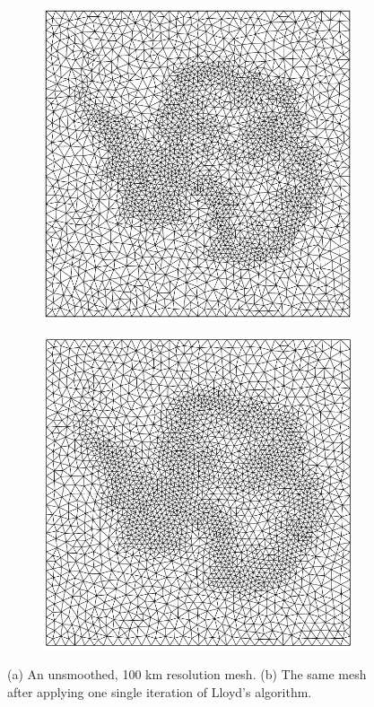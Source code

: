 \documentclass{article}
\begin{document}
\begin{figure}[H] \label{fig:mesh_Lloyds_algorithm}
  \centering
  \begin{subfigure}[b]{0.3\linewidth}
    \includegraphics[width=\linewidth]{Fig_mesh_Lloyd_01.png}
    \caption{}
  \end{subfigure}
  \begin{subfigure}[b]{0.3\linewidth}
    \includegraphics[width=\linewidth]{Fig_mesh_Lloyd_02.png}
    \caption{}
  \end{subfigure}
  \caption{(a) An unsmoothed, 100 km resolution mesh. (b) The same mesh after applying one single iteration of Lloyd's algorithm.}
\end{figure}
\end{document}
